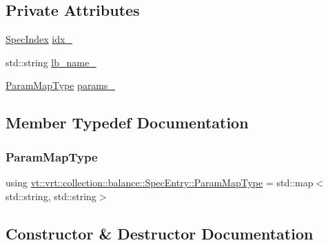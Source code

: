 \subsection*{Private Attributes}
\begin{DoxyCompactItemize}
\item 
\hyperlink{namespacevt_1_1vrt_1_1collection_1_1balance_a72a5e0d9936ddf57f8e6c64e0e9fd123}{Spec\+Index} \hyperlink{structvt_1_1vrt_1_1collection_1_1balance_1_1_spec_entry_ab76105257ea98781af7e039dba9cb63b}{idx\+\_\+}
\item 
std\+::string \hyperlink{structvt_1_1vrt_1_1collection_1_1balance_1_1_spec_entry_ad163d019f9d92288f78026d95a55e175}{lb\+\_\+name\+\_\+}
\item 
\hyperlink{structvt_1_1vrt_1_1collection_1_1balance_1_1_spec_entry_a2ec68beff648a236f7f527dc5deeb4c5}{Param\+Map\+Type} \hyperlink{structvt_1_1vrt_1_1collection_1_1balance_1_1_spec_entry_ac7737db80a6be7a5da8152aad45e93b9}{params\+\_\+}
\end{DoxyCompactItemize}


\subsection{Member Typedef Documentation}
\mbox{\label{structvt_1_1vrt_1_1collection_1_1balance_1_1_spec_entry_a2ec68beff648a236f7f527dc5deeb4c5}} 
\subsubsection{\texorpdfstring{Param\+Map\+Type}{ParamMapType}}
{\footnotesize\ttfamily using \hyperlink{structvt_1_1vrt_1_1collection_1_1balance_1_1_spec_entry_a2ec68beff648a236f7f527dc5deeb4c5}{vt\+::vrt\+::collection\+::balance\+::\+Spec\+Entry\+::\+Param\+Map\+Type} =  std\+::map$<$std\+::string, std\+::string$>$}



\subsection{Constructor \& Destructor Documentation}
\mbox{\label{structvt_1_1vrt_1_1collection_1_1balance_1_1_spec_entry_a40db52d556685cb73056409096a4d4f7}} 
